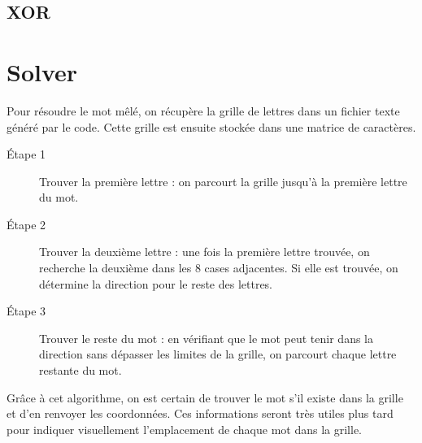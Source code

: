 \documentclass{article}
\begin{document}
\subsection{XOR}

\section{Solver}
Pour résoudre le mot mêlé, on récupère la grille de lettres dans un fichier texte généré par le code. Cette grille est ensuite stockée dans une matrice de caractères.

\begin{description}
    \item[Étape 1] Trouver la première lettre : on parcourt la grille jusqu'à la première lettre du mot.
    
    \item[Étape 2] Trouver la deuxième lettre : une fois la première lettre trouvée, on recherche la deuxième dans les 8 cases adjacentes. Si elle est trouvée, on détermine la direction pour le reste des lettres.
    
    \item[Étape 3] Trouver le reste du mot : en vérifiant que le mot peut tenir dans la direction sans dépasser les limites de la grille, on parcourt chaque lettre restante du mot.
\end{description}
Grâce à cet algorithme, on est certain de trouver le mot s'il existe dans la grille et d'en renvoyer les coordonnées. Ces informations seront très utiles plus tard pour indiquer visuellement l'emplacement de chaque mot dans la grille.
\clearpage
\end{document}
